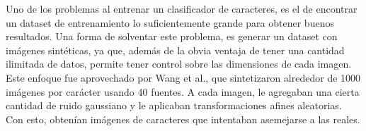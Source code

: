 	Uno de los problemas al entrenar un clasificador de caracteres, es el de encontrar un dataset de entrenamiento lo suficientemente grande para obtener buenos resultados. Una forma de solventar este problema, es generar un dataset con imágenes sintéticas, ya que, además de la  obvia ventaja de tener una cantidad ilimitada de datos, permite tener control sobre las dimensiones de cada imagen. Este enfoque fue aprovechado por Wang et al., que sintetizaron alrededor de 1000 imágenes por carácter usando 40 fuentes. A cada imagen, le agregaban una cierta cantidad de ruido gaussiano y le aplicaban transformaciones afines aleatorias. Con esto, obtenían imágenes de caracteres que intentaban asemejarse a las reales.

	

